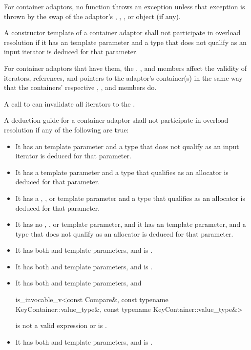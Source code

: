 \pnum
For container adaptors, no  function throws an exception unless that
exception is thrown by the swap of the adaptor's
,
,
, or
 object (if any).

\pnum
A constructor template of a container adaptor
shall not participate in overload resolution
if it has an  template parameter and
a type that does not qualify as an input iterator is deduced for that parameter.

\pnum
For container adaptors that have them,
the , , and  members
affect the validity of iterators, references, and pointers
to the adaptor's container(s) in the same way that
the containers' respective
, , and  members do.
\begin{example}
A call to 
can invalidate all iterators to the .
\end{example}

\pnum
A deduction guide for a container adaptor shall not participate in overload resolution if any of the following are true:
\begin{itemize}
\item It has an  template parameter and a type that does not qualify as an input iterator is deduced for that parameter.
\item It has a  template parameter and a type that qualifies as an allocator is deduced for that parameter.
\item It has a , , or  template parameter and a type that qualifies as an allocator is deduced for that parameter.
\item It has no , , or  template parameter, and it has an  template parameter, and a type that does not qualify as an allocator is deduced for that parameter.
\item It has both  and  template parameters, and  is .
\item It has both  and  template parameters, and
 is .
\item It has both  and  template parameters, and
\begin{codeblock}
is_invocable_v<const Compare&,
               const typename KeyContainer::value_type&,
               const typename KeyContainer::value_type&>
\end{codeblock}
is not a valid expression or is .
\item It has both  and  template parameters, and
 is .
\end{itemize}

